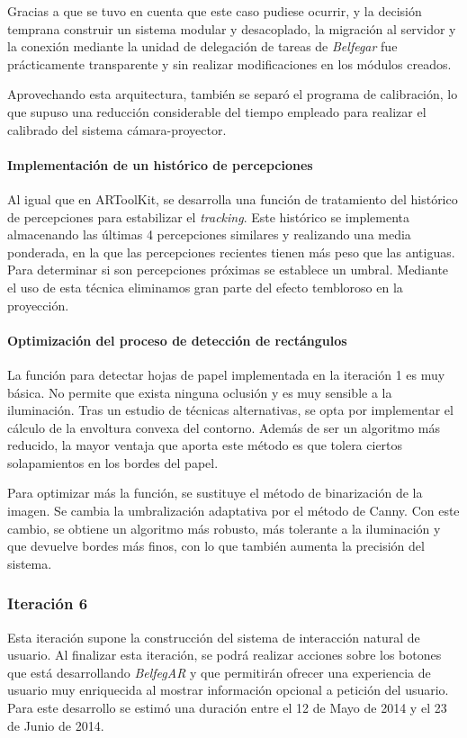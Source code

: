Gracias a que se tuvo en cuenta que este caso pudiese ocurrir, y la decisión temprana construir un sistema  modular y desacoplado, la migración al servidor y la conexión mediante la unidad de delegación de tareas de \textit{Belfegar} fue prácticamente transparente y sin realizar modificaciones en los módulos creados.

Aprovechando esta arquitectura, también se separó el programa de calibración, lo que supuso una reducción considerable del tiempo empleado para realizar el calibrado del sistema cámara-proyector.
 
\paragraph{Implementación de un histórico de percepciones}
Al igual que en ARToolKit, se desarrolla una función de tratamiento del histórico de percepciones para estabilizar el \textit{tracking}. Este histórico se implementa almacenando las últimas 4 percepciones similares y realizando una media ponderada, en la que las percepciones recientes tienen más peso que las antiguas. Para determinar si son percepciones próximas se establece un umbral. Mediante el uso de esta técnica eliminamos gran parte del efecto tembloroso en la proyección.

\paragraph{Optimización del proceso de detección de rectángulos}
La función para detectar hojas de papel implementada en la iteración 1 es muy básica. No permite que exista ninguna oclusión y es muy sensible a la iluminación. Tras un estudio de técnicas alternativas, se opta por implementar el cálculo de la envoltura convexa del contorno. Además de ser un algoritmo más reducido, la mayor ventaja que aporta este método es que tolera ciertos solapamientos en los bordes del papel. 

Para optimizar más la función, se sustituye el método de binarización de la imagen. Se cambia la umbralización adaptativa por el método de Canny. Con este cambio, se obtiene un algoritmo más robusto, más tolerante a la iluminación y que devuelve bordes más finos, con lo que también aumenta la precisión del sistema.

\subsubsection{Iteración 6}
Esta iteración supone la construcción del sistema de interacción natural de usuario. Al finalizar esta iteración, se podrá realizar acciones sobre los botones que está desarrollando \textit{BelfegAR} y que permitirán ofrecer una experiencia de usuario muy enriquecida al mostrar información opcional a petición del usuario. Para este desarrollo se estimó una duración entre el 12 de Mayo de 2014 y el 23 de Junio de 2014.


